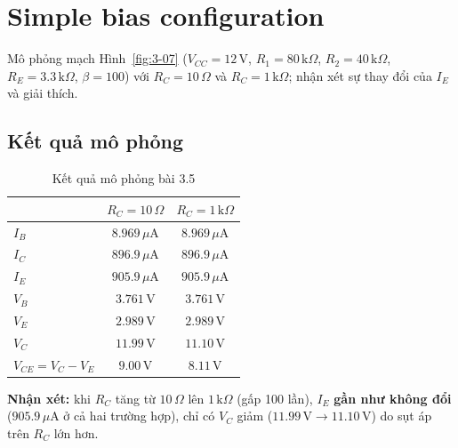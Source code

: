 \section{Simple bias configuration}
Mô phỏng mạch Hình~\ref{fig:3-07} ($V_{CC} = 12\,\text{V}$, $R_1 = 80\,\text{k}\Omega$, $R_2 = 40\,\text{k}\Omega$, $R_E = 3.3\,\text{k}\Omega$, $\beta = 100$) với $R_C = 10\,\Omega$ và $R_C = 1\,\text{k}\Omega$; nhận xét sự thay đổi của $I_E$ và giải thích.


\subsection{Kết quả mô phỏng}

\begin{table}[H]
\centering
\begin{tabular}{l|c|c}
\toprule
 & $R_C = 10\,\Omega$ & $R_C = 1\,\text{k}\Omega$ \\
\midrule
$I_B$ & $8.969\,\mu\text{A}$ & $8.969\,\mu\text{A}$ \\
$I_C$ & $896.9\,\mu\text{A}$ & $896.9\,\mu\text{A}$ \\
$I_E$ & $905.9\,\mu\text{A}$ & $905.9\,\mu\text{A}$ \\
$V_B$ & $3.761\,\text{V}$ & $3.761\,\text{V}$ \\
$V_E$ & $2.989\,\text{V}$ & $2.989\,\text{V}$ \\
$V_C$ & $11.99\,\text{V}$ & $11.10\,\text{V}$ \\
$V_{CE} = V_C - V_E$ & $9.00\,\text{V}$ & $8.11\,\text{V}$ \\
\bottomrule
\end{tabular}
\caption{Kết quả mô phỏng bài 3.5}
\end{table}

\textbf{Nhận xét:} khi $R_C$ tăng từ $10\,\Omega$ lên $1\,\text{k}\Omega$ (gấp 100 lần), $I_E$ \textbf{gần như không đổi} ($905.9\,\mu\text{A}$ ở cả hai trường hợp), chỉ có $V_C$ giảm ($11.99\,\text{V} \to 11.10\,\text{V}$) do sụt áp trên $R_C$ lớn hơn.

